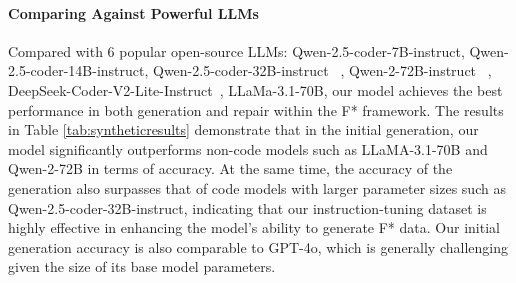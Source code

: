 \paragraph{Comparing Against Powerful LLMs} Compared with 6 popular open-source LLMs: Qwen-2.5-coder-7B-instruct, Qwen-2.5-coder-14B-instruct, Qwen-2.5-coder-32B-instruct ~\cite{hui2024qwen25codertechnicalreport}, Qwen-2-72B-instruct ~\cite{hui2024qwen2}, DeepSeek-Coder-V2-Lite-Instruct~\cite{liu2024deepseek}, LLaMa-3.1-70B, our model achieves the best performance in both generation and repair within the F* framework. The results in Table \ref{tab:syntheticresults} demonstrate that in the initial generation, our model significantly outperforms non-code models such as LLaMA-3.1-70B and Qwen-2-72B in terms of accuracy. At the same time, the accuracy of the generation also surpasses that of code models with larger parameter sizes such as Qwen-2.5-coder-32B-instruct, indicating that our instruction-tuning dataset is highly effective in enhancing the model’s ability to generate F* data. Our initial generation accuracy is also comparable to GPT-4o, which is generally challenging given the size of its base model parameters.
